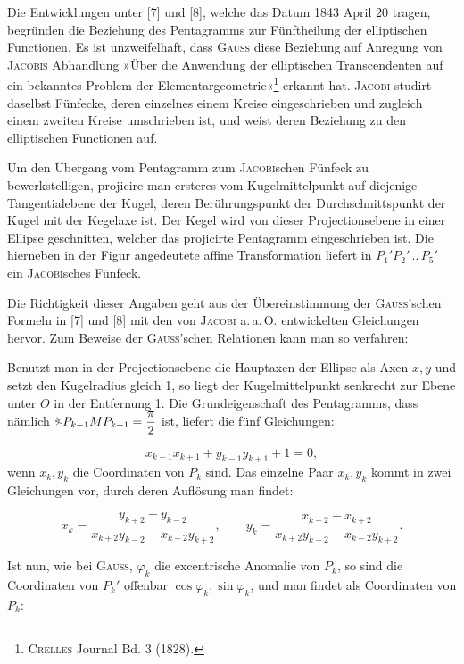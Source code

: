 Die Entwicklungen unter [7] und [8], welche das Datum 1843 April 20 tragen, begründen die
Beziehung des Pentagramms zur Fünftheilung der elliptischen Functionen. Es ist
unzweifelhaft, dass \textsc{Gauss} diese Beziehung auf Anregung von \textsc{Jacobis} Abhandlung »Über die
Anwendung der elliptischen Transcendenten auf ein bekanntes Problem der
Elementargeometrie«\footnote{\textsc{Crelles} Journal Bd. 3 (1828).} erkannt hat. \textsc{Jacobi} studirt
daselbst Fünfecke, deren einzelnes einem Kreise eingeschrieben und zugleich einem zweiten
Kreise umschrieben ist, und weist deren Beziehung zu den elliptischen Functionen auf.

Um den Übergang vom Pentagramm zum \textsc{Jacobi}schen Fünfeck zu bewerkstelligen, projicire man
ersteres vom Kugelmittelpunkt auf diejenige Tangentialebene der Kugel, deren
Berührungspunkt der Durchschnittspunkt der Kugel mit der Kegelaxe ist. Der Kegel wird von
dieser Projectionsebene in einer Ellipse geschnitten, welcher das projicirte Pentagramm
eingeschrieben ist. Die hierneben in der Figur angedeutete affine Transformation liefert in
$P_1'P_2'\,..\,P_5'$ ein \textsc{Jacobi}sches Fünfeck.

\begin{center}\end{center}

Die Richtigkeit dieser Angaben geht aus der Übereinstimmung der \textsc{Gauss}'schen Formeln in [7]
und [8] mit den von \textsc{Jacobi} a.\,a.\,O. entwickelten Gleichungen hervor. Zum Beweise der
\textsc{Gauss}'schen Relationen kann man so verfahren:

Benutzt man in der Projectionsebene die Hauptaxen der Ellipse als Axen $x, y$ und setzt den
Kugelradius gleich 1, so liegt der Kugelmittelpunkt senkrecht zur Ebene unter $O$ in der
Entfernung 1. Die Grundeigenschaft des Pentagramms, dass nämlich
$\HistAngle P_{k-1}MP_{k+1} = \dfrac{\pi}{2}$ ist, liefert die fünf Gleichungen:

\[
x_{k-1}x_{k+1} + y_{k-1}y_{k+1} + 1 = 0,\tag{1}
\]
wenn $x_k, y_k$ die Coordinaten von $P_k$ sind. Das einzelne Paar $x_k, y_k$ kommt in zwei
Gleichungen vor, durch deren Auflösung man findet:

\[
x_k = \dfrac{y_{k+2}-y_{k-2}}{x_{k+2}y_{k-2}-x_{k-2}y_{k+2}}, \qquad
y_k = \dfrac{x_{k-2}-x_{k+2}}{x_{k+2}y_{k-2}-x_{k-2}y_{k+2}}.\tag{2}
\]

Ist nun, wie bei \textsc{Gauss}, $\varphi_k$ die excentrische Anomalie von $P_k$, so sind die
Coordinaten von $P_k'$ offenbar $\cos\varphi_k, \sin\varphi_k$, und man findet als
Coordinaten von $P_k$:

